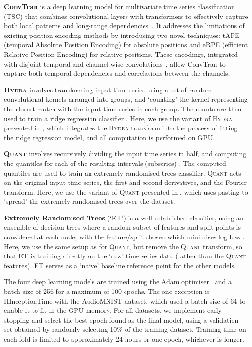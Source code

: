 \documentclass[twoside,11pt,preprint]{article}
\newcommand{\quant}{\textsc{Quant}}
\newcommand{\hydra}{\textsc{Hydra}}
\begin{document}
\textbf{ConvTran} is a deep learning model for multivariate time series classification (TSC) that combines convolutional layers with transformers to effectively capture both local patterns and long-range dependencies~\citep{ConvTran}. It addresses the limitations of existing position encoding methods by introducing two novel techniques: tAPE (temporal Absolute Position Encoding) for absolute positions and eRPE (efficient Relative Position Encoding) for relative positions. These encodings, integrated with disjoint temporal and channel-wise convolutions~\citep{Disjoin-CNN}, allow ConvTran to capture both temporal dependencies and correlations between the channels.

\textbf{{\hydra}} involves transforming input time series using a set of random convolutional kernels arranged into groups, and `counting' the kernel representing the closest match with the input time series in each group. The counts are then used to train a ridge regression classifier \citep{dempster_etal_2023}. Here, we use the variant of {\hydra} presented in \citet{dempster_etal_2024}, which integrates the {\hydra} transform into the process of fitting the ridge regression model, and all computation is performed on GPU.

\textbf{{\quant}} involves recursively dividing the input time series in half, and computing the quantiles for each of the resulting intervals (subseries) \citep{dempster_etal_2024b}. The computed quantiles are used to train an extremely randomised trees classifier. {\quant} acts on the original input time series, the first and second derivatives, and the Fourier transform. Here, we use the variant of {\quant} presented in \citet{dempster_etal_2024}, which uses pasting to `spread' the extremely randomised trees over the dataset.

\textbf{Extremely Randomised Trees} (`ET') is a well-established classifier, using an ensemble of decision trees where a random subset of features and split points is considered at each node, with the feature/split chosen which minimises log loss \citep{geurts_etal_2006}. Here, we use the same setup as for {\quant}, but remove the {\quant} transform, so that ET is training directly on the `raw' time series data (rather than the {\quant} features). ET serves as a `na\"{i}ve' baseline reference point for the other models.

The four deep learning models are trained using the Adam optimiser~\citep{Kingma2015} and a batch size of 256 for a maximum of 100 epochs. The one exception is HInceptionTime with the AudioMNIST dataset, which used a batch size of 64 to enable it to fit in the GPU memory. For all datasets, we implement early stopping and select the best epoch found as the final model, using a validation set obtained by randomly selecting 10\% of the training dataset. Training time on each fold is limited to approximately 24 hours or one epoch, whichever is longer.
\end{document}
